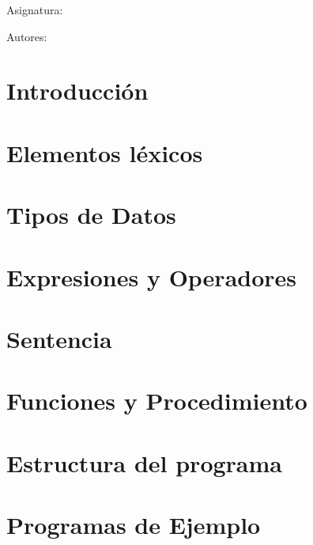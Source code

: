 \documentclass{article}
\begin{document}
\begin{titlepage}
    \begin{center}
        {\bfseries\LARGE \myuniversity \par}
        \vspace{0.5cm}
        {\scshape\Large \mydegree \par}
        \vspace{3cm}
        {\scshape\Huge \mytitle \par}
        \vspace{2cm}
        \vfill
        {\Large Asignatura: \par}
        {\Large \mysubject \par}
        \vspace{2cm}
        {\Large Autores: \par}
        {\Large \myauthorone \par}
        \vspace{0.2cm}
        {\Large \myauthortwo \par}
        \vspace{0.5cm}
        \vspace{1cm}
    \end{center}
\end{titlepage}

\tableofcontents
\newpage

\section{Introducción}


\section{Elementos léxicos}


\section{Tipos de Datos}


\section{Expresiones y Operadores}


\section{Sentencia}


\section{Funciones y Procedimiento}


\section{Estructura del programa}


\section{Programas de Ejemplo}

\end{document}
